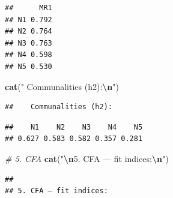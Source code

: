 \documentclass[
]{article}
\newenvironment{Shaded}{\begin{snugshade}}{\end{snugshade}}
\newcommand{\CommentTok}[1]{\textcolor[rgb]{0.56,0.35,0.01}{\textit{#1}}}
\newcommand{\DecValTok}[1]{\textcolor[rgb]{0.00,0.00,0.81}{#1}}
\newcommand{\FunctionTok}[1]{\textcolor[rgb]{0.13,0.29,0.53}{\textbf{#1}}}
\newcommand{\NormalTok}[1]{#1}
\newcommand{\SpecialCharTok}[1]{\textcolor[rgb]{0.81,0.36,0.00}{\textbf{#1}}}
\newcommand{\StringTok}[1]{\textcolor[rgb]{0.31,0.60,0.02}{#1}}
\begin{document}
\begin{verbatim}
##      MR1
## N1 0.792
## N2 0.764
## N3 0.763
## N4 0.598
## N5 0.530
\end{verbatim}

\begin{Shaded}
\begin{Highlighting}[]
\FunctionTok{cat}\NormalTok{(}\StringTok{"   Communalities (h2):}\SpecialCharTok{\textbackslash{}n}\StringTok{"}\NormalTok{)}
\end{Highlighting}
\end{Shaded}

\begin{verbatim}
##    Communalities (h2):
\end{verbatim}

\begin{Shaded}
\end{Shaded}

\begin{verbatim}
##    N1    N2    N3    N4    N5 
## 0.627 0.583 0.582 0.357 0.281
\end{verbatim}

\begin{Shaded}
\begin{Highlighting}[]
\CommentTok{\# 5. CFA}
\FunctionTok{cat}\NormalTok{(}\StringTok{"}\SpecialCharTok{\textbackslash{}n}\StringTok{5. CFA — fit indices:}\SpecialCharTok{\textbackslash{}n}\StringTok{"}\NormalTok{)}
\end{Highlighting}
\end{Shaded}

\begin{verbatim}
## 
## 5. CFA — fit indices:
\end{verbatim}
\end{document}
